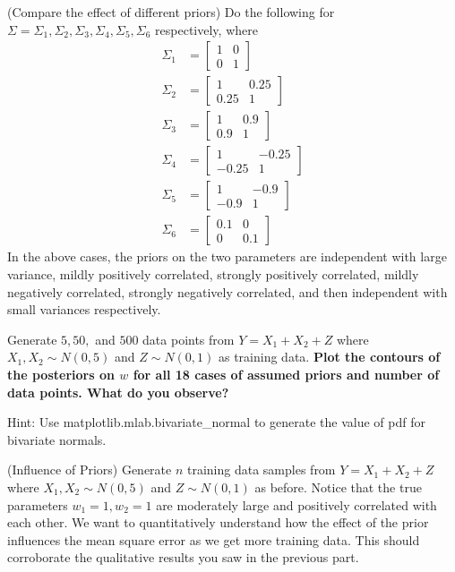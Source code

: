 \begin{Parts}
\Part (Compare the effect of different priors) Do the following for
$\Sigma = \Sigma_1,\Sigma_2,\Sigma_3,\Sigma_4,\Sigma_5,\Sigma_6$ respectively, where 
\begin{align*}
\Sigma_1 &= \begin{bmatrix}
    1      & 0\\
    0      & 1
    \end{bmatrix} \\
\Sigma_2 &= \begin{bmatrix}
1      & 0.25\\
0.25      & 1
\end{bmatrix} \\
\Sigma_3 &= \begin{bmatrix}
1      & 0.9\\
0.9      & 1
\end{bmatrix} \\
\Sigma_4 &= \begin{bmatrix}
1      & -0.25\\
-0.25      & 1 
\end{bmatrix}  \\
\Sigma_5 &= \begin{bmatrix}
1      & -0.9\\
-0.9      & 1 
\end{bmatrix}  \\
\Sigma_6 &= \begin{bmatrix}
0.1      & 0 \\
0      & 0.1 
\end{bmatrix}  
\end{align*} 
In the above cases, the priors on the two parameters are independent
with large variance, mildly positively correlated, strongly positively
correlated, mildly negatively correlated, strongly negatively
correlated, and then independent with small variances respectively. 

Generate $5, 50,$ and $500$ data points from $Y=X_1+X_2+Z$ where
$X_1,X_2 \sim N(0,5)$ and $Z\sim N(0,1)$ as training data. {\bf Plot the contours of the posteriors on
  $w$ for all 18 cases of assumed priors and number of data points. What do you observe?}

Hint: Use matplotlib.mlab.bivariate\_normal to generate the value of pdf for bivariate normals.  


\Part (Influence of Priors) Generate $n$ training data samples from
$Y=X_1+X_2+Z$ where $X_1,X_2 \sim N(0,5)$ and $Z\sim N(0,1)$ as
before. Notice that the true parameters $w_1 = 1, w_2 = 1$ are
moderately large and positively correlated with each other. We want to
quantitatively understand how the effect of the prior influences the
mean square error as we get more training data.  This should
corroborate the qualitative results you saw in the previous part.


\end{Parts}
